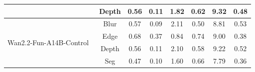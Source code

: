 \begin{table}[t]
{\begin{tabular}{l|c|cccccc}
 & Depth & 0.56 & 0.11 & 1.82 & 0.62 & \cellcolor{lightgreen!25}9.32 & \cellcolor{lightgreen!25}0.48 \\
\midrule
\multirow{4}{*}{Wan2.2-Fun-A14B-Control~\cite{wan22fun}}
 & Blur  & 0.57 & 0.09 & 2.11 & 0.50 & 8.81 & \cellcolor{lightgreen!25}0.53 \\
 & Edge  & \cellcolor{lightgreen!25}0.68 & \cellcolor{lightgreen!25}0.37 & \cellcolor{lightgreen!25}0.84 & \cellcolor{lightgreen!25}0.74 & 9.00 & 0.38 \\
 & Depth & 0.56 & 0.11 & 2.10 & 0.58 & \cellcolor{lightgreen!25}9.22 & 0.52 \\
 & Seg   & 0.47 & 0.10 & 1.60 & 0.66 & 7.79 & 0.36 \\
\bottomrule
\end{tabular}}
\vspace{-6pt}
\label{tab:transfer_results}
\end{table}
